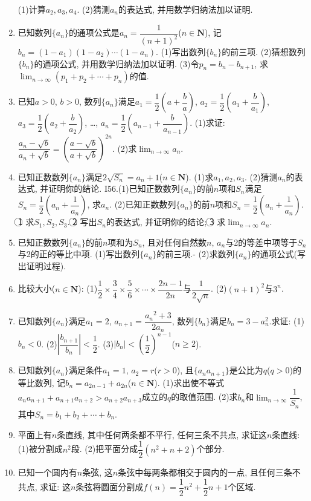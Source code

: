 \documentclass[10pt,a4paper]{article}
\begin{document}
\begin{enumerate}[1.]
(1)计算$a_2,a_3,a_4$.
(2)猜测$a_n$的表达式, 并用数学归纳法加以证明.
\item 已知数列$\{a_n\}$的通项公式是$a_n=\dfrac 1{(n+1)^2}$($n\in \mathbf{N}$), 记$b_n=(1-a_1)(1-a_2)\cdots (1-a_n)$.
(1)写出数列$\{b_n\}$的前三项.
(2)猜想数列$\{b_n\}$的通项公式, 并用数学归纳法加以证明.
(3)令$p_n=b_n-b_{n+1}$, 求$\displaystyle \lim_{n\to \infty} (p_1+p_2+\cdots +p_n)$的值.
\item 已知$a>0$, $b>0$, 数列$\{a_n\}$满足$a_1=\dfrac 12(a+\dfrac ba)$, $a_2=\dfrac 12(a_1+\dfrac b{a_1})$, $a_3=\dfrac 12(a_2+\dfrac b{a_2})$, …, $a_n=\dfrac 12(a_{n-1}+\dfrac b{a_{n-1}})$.
(1)求证: $\dfrac{{a_n}-\sqrt b}{{a_n}+\sqrt b}=(\dfrac{a-\sqrt b}{a+\sqrt b})^{2n}$.
(2)求$\displaystyle \lim_{n\to \infty} a_n$.
\item 已知正数数列$\{a_n\}$满足$2\sqrt {S_n}=a_n+1$($n\in \mathbf{N}$).
(1)求$a_1,a_2,a_3$.
(2)猜测$a_n$的表达式, 并证明你的结论.
I56.(1)已知正数数列$\{a_n\}$的前$n$项和$S_n$满足$S_n=\dfrac 12(a_n+\dfrac 1{a_n})$, 求$a_n$.
(2)已知正数数列$\{a_n\}$的前$n$项和$S_n=\dfrac 12(a_n+\dfrac 1{a_n})$.
\textcircled{1} 求$S_1,S_2,S_3$.
\textcircled{2} 写出$S_n$的表达式, 并证明你的结论;
\textcircled{3} 求$\displaystyle \lim_{n\to \infty} a_n$.
\item 已知正数数列$\{a_n\}$的前$n$项和为$S_n$, 且对任何自然数$n$, $a_n$与2的等差中项等于$S_n$与2的正的等比中项.
(1)写出数列$\{a_n\}$的前三项.-
    (2)求数列$\{a_n\}$的通项公式(写出证明过程).
\item 比较大小($n\in \mathbf{N}$):
(1)$\dfrac 12\times \dfrac 34\times \dfrac 56\times \cdots \times \dfrac{2n-1}{2n}$与$\dfrac 1{2\sqrt n}$.
(2)$(n+1)^2$与$3^n$.
\item 已知数列$\{a_n\}$满足$a_1=2$, $a_{n+1}=\dfrac{{a_n}^2+3}{2{a_n}}$, 数列$\{b_n\}$满足$b_n=3-a_n^2$.求证:
(1)$b_n<0$.
(2)$|\dfrac{{b_{n+1}}}{b_n}|<\dfrac 12$.
(3)$|b_n|<(\dfrac 12)^{n-1}$($n\ge 2$).
\item 已知数列$\{a_n\}$满足条件$a_1=1$, $a_2=r$($r>0$), 且$\{a_na_{n+1}\}$是公比为$q$($q>0$)的等比数列, 记$b_n=a_{2n-1}+a_{2n}$($n\in \mathbf{N}$).
(1)求出使不等式$a_na_{n+1}+a_{n+1}a_{n+2}>a_{n+2}a_{n+3}$成立的$q$的取值范围.
(2)求$b_n$和$\displaystyle \lim_{n\to \infty} \dfrac 1{S_n}$, 其中$S_n=b_1+b_2+\cdots +b_n$.
\item 平面上有$n$条直线, 其中任何两条都不平行, 任何三条不共点, 求证这$n$条直线:
(1)被分割成$n^2$段.
(2)把平面分成$\dfrac 12(n^2+n+2)$个部分.
\item 已知一个圆内有$n$条弦, 这$n$条弦中每两条都相交于圆内的一点, 且任何三条不共点, 求证: 这$n$条弦将圆面分割成$f(n)=\dfrac 12n^2+\dfrac 12n+1$个区域.

\end{enumerate}
\end{document}
